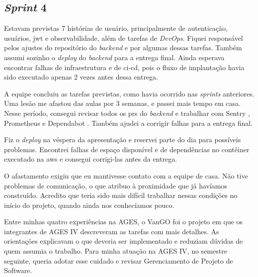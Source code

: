 \subsection{\textit{Sprint} 4}

Estavam previstas 7 histórias de usuário, principalmente de autenticação,
usuários, \ac{jwt} e observabilidade, além de tarefas de \textit{DevOps}.
Fiquei responsável pelos ajustes do repositório do \textit{backend} e por
algumas dessas tarefas. Também assumi sozinho o \textit{deploy} do
\textit{backend} para a entrega final. Ainda esperava encontrar falhas de
infraestrutura e de \ac{ci-cd}, pois o fluxo de implantação havia sido
executado apenas 2 vezes antes dessa entrega.

A equipe concluiu as tarefas previstas, como havia ocorrido nas
\textit{sprints} anteriores. Uma lesão me afastou das aulas por 3 semanas, e
passei mais tempo em casa. Nesse período, consegui revisar todos os \acp{pr}
do \textit{backend} e trabalhar com Sentry \cite{sentry-docs}, Prometheus
\cite{prometheus-docs} e Dependabot \cite{dependabot-docs}. Também ajudei a
corrigir falhas para a entrega final.

Fiz o \textit{deploy} na véspera da apresentação e reservei parte do dia para
possíveis problemas. Encontrei falhas de espaço disponível e de dependências
no contêiner executado na \ac{aws} e consegui corrigi-las antes da entrega.

O afastamento exigiu que eu mantivesse contato com a equipe de casa. Não tive
problemas de comunicação, o que atribuo à proximidade que já havíamos
construído. Acredito que teria sido mais difícil trabalhar nessas condições
no início do projeto, quando ainda nos conhecíamos pouco.

Entre minhas quatro experiências na AGES, o VanGO foi o projeto em que os
integrantes de AGES IV descreveram as tarefas com mais detalhes. As orientações explicavam
o que deveria ser implementado e reduziam dúvidas de quem assumia o trabalho.
Para minha atuação na AGES IV, no semestre seguinte, queria adotar esse
cuidado e revisar Gerenciamento de Projeto de Software.
